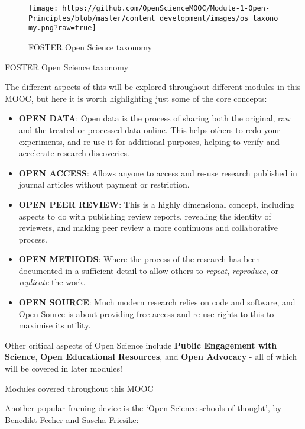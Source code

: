 \documentclass[]{book}
\begin{document}
\begin{figure}
\centering
\texttt{[image: https://github.com/OpenScienceMOOC/Module-1-Open-Principles/blob/master/content\_development/images/os\_taxonomy.png?raw=true]}
\caption{FOSTER Open Science taxonomy}
\end{figure}

FOSTER Open Science taxonomy

The different aspects of this will be explored throughout different modules in this MOOC, but here it is worth highlighting just some of the core concepts:

\begin{itemize}
\item
  \textbf{OPEN DATA}: Open data is the process of sharing both the original, raw and the treated or processed data online. This helps others to redo your experiments, and re-use it for additional purposes, helping to verify and accelerate research discoveries.
\item
  \textbf{OPEN ACCESS}: Allows anyone to access and re-use research published in journal articles without payment or restriction.
\item
  \textbf{OPEN PEER REVIEW}: This is a highly dimensional concept, including aspects to do with publishing review reports, revealing the identity of reviewers, and making peer review a more continuous and collaborative process.
\item
  \textbf{OPEN METHODS}: Where the process of the research has been documented in a sufficient detail to allow others to \emph{repeat}, \emph{reproduce}, or \emph{replicate} the work.
\item
  \textbf{OPEN SOURCE}: Much modern research relies on code and software, and Open Source is about providing free access and re-use rights to this to maximise its utility.
\end{itemize}

Other critical aspects of Open Science include \textbf{Public Engagement with Science}, \textbf{Open Educational Resources}, and \textbf{Open Advocacy} - all of which will be covered in later modules!

Modules covered throughout this MOOC

Another popular framing device is the `Open Science schools of thought', by \href{https://github.com/OpenScienceMOOC/Module-1-Open-Principles/blob/master/Reading\%20Material_Open\%20Principles/Fecher\%20and\%20Friesike\%2C\%202014.pdf}{Benedikt Fecher and Sascha Friesike}:
\end{document}
